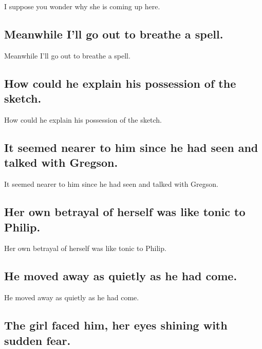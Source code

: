 \documentclass[]{article}
\begin{document}
I suppose you wonder why she is coming up here.

\hypertarget{meanwhile-ill-go-out-to-breathe-a-spell.}{%
\subsection{Meanwhile I'll go out to breathe a
spell.}\label{meanwhile-ill-go-out-to-breathe-a-spell.}}

Meanwhile I'll go out to breathe a spell.

\hypertarget{how-could-he-explain-his-possession-of-the-sketch.}{%
\subsection{How could he explain his possession of the
sketch.}\label{how-could-he-explain-his-possession-of-the-sketch.}}

How could he explain his possession of the sketch.

\hypertarget{it-seemed-nearer-to-him-since-he-had-seen-and-talked-with-gregson.}{%
\subsection{It seemed nearer to him since he had seen and talked with
Gregson.}\label{it-seemed-nearer-to-him-since-he-had-seen-and-talked-with-gregson.}}

It seemed nearer to him since he had seen and talked with Gregson.

\hypertarget{her-own-betrayal-of-herself-was-like-tonic-to-philip.}{%
\subsection{Her own betrayal of herself was like tonic to
Philip.}\label{her-own-betrayal-of-herself-was-like-tonic-to-philip.}}

Her own betrayal of herself was like tonic to Philip.

\hypertarget{he-moved-away-as-quietly-as-he-had-come.}{%
\subsection{He moved away as quietly as he had
come.}\label{he-moved-away-as-quietly-as-he-had-come.}}

He moved away as quietly as he had come.

\hypertarget{the-girl-faced-him-her-eyes-shining-with-sudden-fear.}{%
\subsection{The girl faced him, her eyes shining with sudden
fear.}\label{the-girl-faced-him-her-eyes-shining-with-sudden-fear.}}
\end{document}
